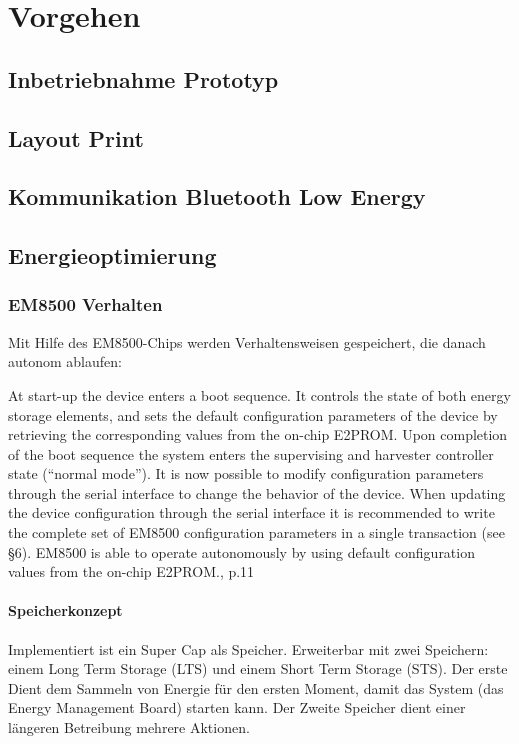 \chapter{Vorgehen}

\section{Inbetriebnahme Prototyp}

\section{Layout Print}

\section{Kommunikation Bluetooth Low Energy}

\section{Energieoptimierung}

\subsection{EM8500 Verhalten}

Mit Hilfe des EM8500-Chips werden Verhaltensweisen gespeichert, die danach autonom ablaufen:

At start-up the device enters a boot sequence. It controls the state of both energy storage elements, and sets the default configuration parameters
of the device by retrieving the corresponding values from the on-chip E2PROM.
Upon completion of the boot sequence the system enters the supervising and harvester controller state (“normal mode”). It is now possible to
modify configuration parameters through the serial interface to change the behavior of the device. When updating the device configuration through
the serial interface it is recommended to write the complete set of EM8500 configuration parameters in a single transaction (see §6).
EM8500 is able to operate autonomously by using default configuration values from the on-chip E2PROM.\cite{datasheet_EM85}, p.11

\subsubsection{Speicherkonzept}

Implementiert ist ein Super Cap als Speicher. Erweiterbar mit zwei Speichern: einem Long Term Storage (LTS) und einem Short Term Storage (STS). Der erste Dient dem Sammeln von Energie für den ersten Moment, damit das System (das Energy Management Board) starten kann. Der Zweite Speicher dient einer längeren Betreibung mehrere Aktionen.

